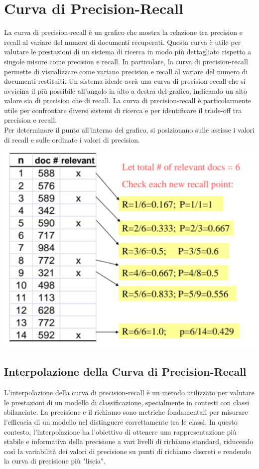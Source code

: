 \documentclass{report}
\begin{document}
	\section{Curva di Precision-Recall}
	La curva di precision-recall è un grafico che mostra la relazione tra precision e recall al variare del numero di documenti recuperati. Questa curva è utile per valutare le prestazioni di un sistema di ricerca in modo più dettagliato rispetto a singole misure come precision e recall. In particolare, la curva di precision-recall permette di visualizzare come variano precision e recall al variare del numero di documenti restituiti. Un sistema ideale avrà una curva di precision-recall che si avvicina il più possibile all'angolo in alto a destra del grafico, indicando un alto valore sia di precision che di recall. La curva di precision-recall è particolarmente utile per confrontare diversi sistemi di ricerca e per identificare il trade-off tra precision e recall.
	\vspace{\baselineskip}\\
	Per determinare il punto all'interno del grafico, si posizionano sulle ascisse i valori di recall e sulle ordinate i valori di precision. 
	\begin{center}
		\includegraphics[scale=0.5]{assets/pre-rec-graph.png}
	\end{center}

	\subsection{Interpolazione della Curva di Precision-Recall}
	L'interpolazione della curva di precision-recall è un metodo utilizzato per valutare le prestazioni di un modello di classificazione, specialmente in contesti con classi sbilanciate. La precisione e il richiamo sono metriche fondamentali per misurare l'efficacia di un modello nel distinguere correttamente tra le classi. In questo contesto, l'interpolazione ha l'obiettivo di ottenere una rappresentazione più stabile e informativa della precisione a vari livelli di richiamo standard, riducendo così la variabilità dei valori di precisione su punti di richiamo discreti e rendendo la curva di precisione più "liscia".
\end{document}
